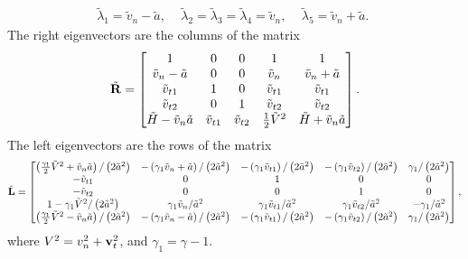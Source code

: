 \begin{gather}
\tilde{\lambda}_1 = \tilde{v}_n - \tilde{a} \text{, }\quad 
\tilde{\lambda}_2 = \tilde{\lambda}_3 = \tilde{\lambda}_4 = \tilde{v}_n \text{, }\quad 
\tilde{\lambda}_5 = \tilde{v}_n + \tilde{a} \text{. } 
\end{gather}
The right eigenvectors are the columns of the matrix
\begin{gather}
\tilde{\mathbf{R}} = 
\begin{bmatrix}
1  & 0 & 0 & 1 & 1 \\
\tilde{v}_n - \tilde{a} & 0 & 0 & \tilde{v}_n & \tilde{v}_n + \tilde{a} \\
\tilde{v}_{t1} & 1 & 0 & \tilde{v}_{t1}  & \tilde{v}_{t1} \\
\tilde{v}_{t2} & 0 & 1 & \tilde{v}_{t2} & \tilde{v}_{t2} \\
\tilde{H} - \tilde{v}_n\tilde{a} & \tilde{v}_{t1} & \tilde{v}_{t2} & \frac{1}{2}\tilde{V}^2 & \tilde{H} + \tilde{v}_n\tilde{a} 
\end{bmatrix} .
\end{gather}
The left eigenvectors are the rows of the matrix
\begin{gather}
\tilde{\mathbf{L}} = 
\begin{bmatrix}
\left(\frac{\gamma_1}{2}\tilde{V}^2 + \tilde{v}_n\tilde{a}\right)/\left(2\tilde{a}^2\right)  & 
-\left(\gamma_1\tilde{v}_n + \tilde{a}\right)/\left(2\tilde{a}^2\right) & 
-\left(\gamma_1\tilde{v}_{t1}\right)/\left(2\tilde{a}^2\right) &  
-\left(\gamma_1\tilde{v}_{t2}\right)/\left(2\tilde{a}^2\right) &  \gamma_1/\left(2\tilde{a}^2\right) \\
-\tilde{v}_{t1} & 0 & 1 & 0 & 0 \\
-\tilde{v}_{t2} & 0 & 0 & 1 & 0 \\
1 - \gamma_1\tilde{V}^2/\left(2\tilde{a}^2\right)  & \gamma_1\tilde{v}_n/\tilde{a}^2 &
\gamma_1\tilde{v}_{t1}/\tilde{a}^2 & \gamma_1\tilde{v}_{t2}/\tilde{a}^2 & -\gamma_1/\tilde{a}^2 \\
\left(\frac{\gamma_1}{2}\tilde{V}^2 - \tilde{v}_n\tilde{a}\right)/\left(2\tilde{a}^2\right)  & 
-\left(\gamma_1\tilde{v}_n - \tilde{a}\right)/\left(2\tilde{a}^2\right) & 
-\left(\gamma_1\tilde{v}_{t1}\right)/\left(2\tilde{a}^2\right) &  
-\left(\gamma_1\tilde{v}_{t2}\right)/\left(2\tilde{a}^2\right) &  \gamma_1/\left(2\tilde{a}^2\right) 
\end{bmatrix} ,
\end{gather}
where $V^2 = v_n^2 + \mathbf{v}_t^2$, and $\gamma_1 = \gamma - 1$.

